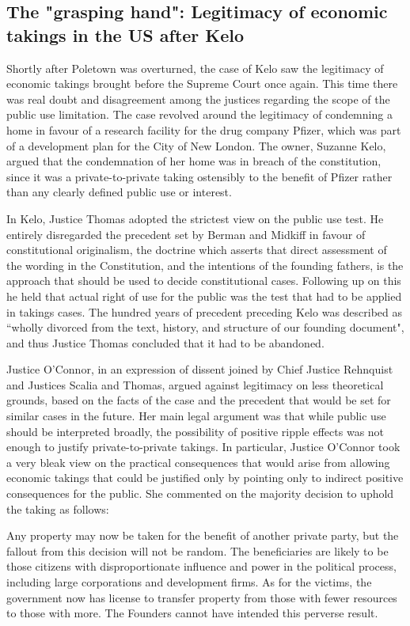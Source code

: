 \subsection{The "grasping hand": Legitimacy of economic takings in the US after Kelo}

Shortly after Poletown was overturned, the case of Kelo saw the legitimacy of economic takings brought before the Supreme Court once again. This time there was real doubt and disagreement among the justices regarding the scope of the public use limitation. The case revolved around the legitimacy of condemning a home in favour of a research facility for the drug company Pfizer, which was part of a development plan for the City of New London.  The owner, Suzanne Kelo, argued that the condemnation of her home was in breach of the constitution, since it was a private-to-private taking ostensibly to the benefit of Pfizer rather than any clearly defined public use or interest.

In Kelo, Justice Thomas adopted the strictest view on the public use test. He entirely disregarded  the precedent set by Berman and Midkiff in favour of constitutional originalism, the doctrine which asserts that direct assessment of the wording in the Constitution, and the intentions of the founding fathers, is the approach that should be used to decide constitutional cases. Following up on this he held that actual right of use for the public was the test that had to be applied in takings cases. The hundred years of precedent preceding Kelo was described as “wholly divorced from the text, history, and structure of our founding document", and thus Justice Thomas concluded that it had to be abandoned. 

Justice O'Connor, in an expression of dissent joined by Chief Justice Rehnquist and Justices Scalia
and Thomas, argued against legitimacy on less theoretical grounds, based on the facts of the case and the precedent that would be set for similar cases in the future. Her main legal argument was that while public use should be interpreted broadly, the possibility of positive ripple effects was not enough to justify private-to-private takings. In particular, Justice O'Connor took a very bleak view on the practical consequences that would arise from allowing economic takings that could be justified only by pointing only to indirect positive consequences for the public. She commented on the majority decision to uphold the taking as follows: 

Any property may now be taken for the benefit of another private party, but the fallout from this decision will not be random. The beneficiaries are likely to be those citizens with disproportionate influence and power in the political process, including large corporations and development firms. As for the victims, the government now has license to transfer property from those with fewer resources to those with more. The Founders cannot have intended this perverse result.

